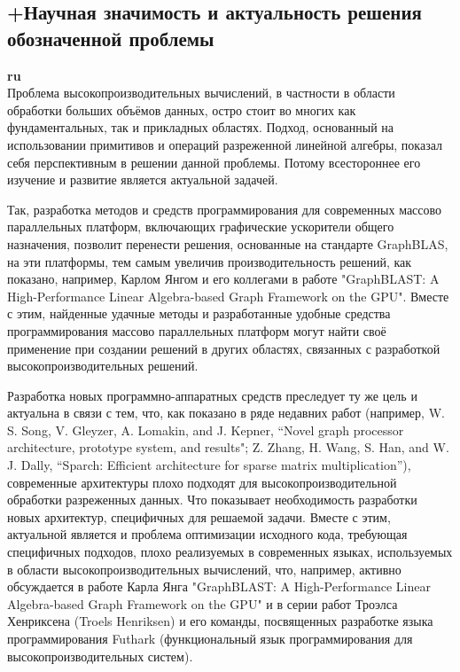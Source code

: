 \documentclass[12pt]{article}  %
\theoremstyle{remark}
\begin{document}
\subsection{+Научная значимость и актуальность решения обозначенной проблемы}

\textbf{ru}\\

Проблема высокопроизводительных вычислений, в частности в области обработки больших объёмов данных, остро стоит во многих как фундаментальных, так и прикладных областях. Подход, основанный на использовании примитивов и операций разреженной линейной алгебры, показал себя перспективным в решении данной проблемы. Потому всестороннее его изучение и развитие является актуальной задачей.

Так, разработка методов и средств программирования для современных массово параллельных платформ, включающих графические ускорители общего назначения, позволит перенести решения, основанные на стандарте GraphBLAS, на эти платформы, тем самым увеличив производительность решений, как показано, например, Карлом Янгом и его коллегами в работе "GraphBLAST: A High-Performance Linear Algebra-based Graph Framework on the GPU". Вместе с этим, найденные удачные методы и разработанные удобные средства программирования массово параллельных платформ могут найти своё применение при создании решений в других областях, связанных с разработкой высокопроизводительных решений. 

Разработка новых программно-аппаратных средств преследует ту же цель и актуальна в связи с тем, что, как показано в ряде недавних работ (например, W. S. Song, V. Gleyzer, A. Lomakin, and J. Kepner, “Novel graph
processor architecture, prototype system, and results"; Z. Zhang, H. Wang, S. Han, and W. J. Dally, “Sparch: Efficient architecture for sparse matrix multiplication”), современные архитектуры плохо подходят для высокопроизводительной обработки разреженных данных. Что показывает необходимость разработки новых архитектур, специфичных для решаемой задачи. Вместе с этим, актуальной является и проблема оптимизации исходного кода, требующая специфичных подходов, плохо реализуемых в современных языках, используемых в области высокопроизводительных вычислений, что, например, активно обсуждается в работе Карла Янга "GraphBLAST: A High-Performance Linear Algebra-based Graph Framework on the GPU" и в серии работ Троэлса Хенриксена (Troels Henriksen) и его команды, посвященных разработке языка программирования Futhark (функциональный язык программирования для высокопроизводительных систем). 
\end{document}
